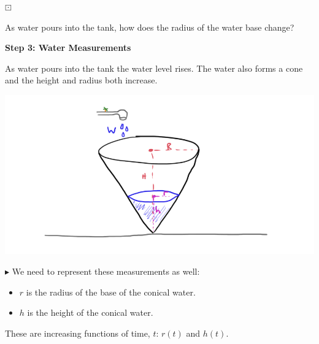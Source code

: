 \documentclass{ximera}
\begin{document}
\begin{question} $\boxdot$ 

As water pours into the tank, how does the radius of the water base change?

\begin{multipleChoice}
\end{multipleChoice}

\end{question}









\textbf{\textcolor{purple!85!blue}{Step 3: Water Measurements}}


As water pours into the tank the water level rises.  The water also forms a cone and the height and radius both increase.  








\begin{image}
\includegraphics{pics/cone_4.png}
\end{image}





$\blacktriangleright$ We need to represent these measurements as well:

\begin{itemize}
\item $r$ is the radius of the base of the conical water.
\item $h$ is the height of the conical water.
\end{itemize}

These are increasing functions of time, $t$: $r(t)$ and $h(t)$.
\end{document}

